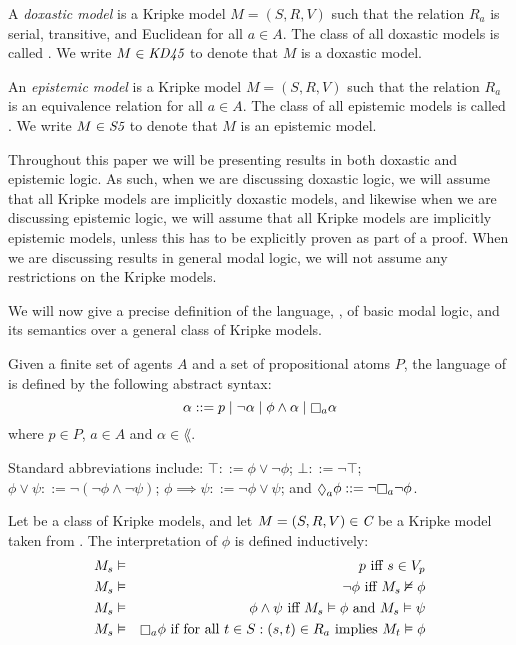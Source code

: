 \begin{definition}
A \textit{doxastic model} is a Kripke model $M = (S, R, V)$ such that the
relation $R_a$ is serial, transitive, and Euclidean for all $a \in A$. The class
of all doxastic models is called \classKD{}. We write $M \in \textit{KD45}{}$ to
denote that $M$ is a doxastic model.
\end{definition}

\begin{definition}
An \textit{epistemic model} is a Kripke model $M = (S, R, V)$ such that the
relation $R_a$ is an equivalence relation for all $a \in A$. The class of all
epistemic models is called \classS{}. We write $M \in \textit{S5}{}$ to denote that
$M$ is an epistemic model.
\end{definition}

Throughout this paper we will be presenting results in both doxastic and
epistemic logic.  As such, when we are discussing doxastic logic, we will
assume that all Kripke models are implicitly doxastic models, and likewise when
we are discussing epistemic logic, we will assume that all Kripke models are
implicitly epistemic models, unless this has to be explicitly proven as part of
a proof. When we are discussing results in general modal logic, we will not
assume any restrictions on the Kripke models.

We will now give a precise definition of the language, \lang{}, of basic modal
logic, and its semantics over a general class of Kripke models.

\begin{definition}
Given a finite set of agents $A$ and a set of propositional atoms $P$, the
language of \langF{} is defined by the following abstract syntax:
$$
\alpha ::=  p \bnfalt
            \neg \alpha \bnfalt
            \phi \land \alpha \bnfalt
            \knows_a \alpha
$$
where $p \in P$, $a \in A$ and $\alpha \in \lang{}$.
\end{definition}

Standard abbreviations include:
$\top ::= \phi \lor \neg \phi$;
$\bot ::= \neg \top$;
$\phi \lor \psi ::= \neg (\neg \phi \land \neg \psi)$;
$\phi \implies \psi ::= \neg \phi \lor \psi$;
and $\suspects_a \phi ::= \neg \knows_a \neg \phi$.

\begin{definition}
Let \classC{} be a class of Kripke models, and let $M = (S, R, V) \in \textit{C}$
be a Kripke model taken from \classC{}. The interpretation of $\phi$ is defined
inductively:
\begin{eqnarray*}
M_s &\entails& p \text{ iff } s \in V_p\\
M_s &\entails& \neg \phi \text{ iff } M_s \nentails \phi\\
M_s &\entails& \phi \land \psi \text{ iff } M_s \entails \phi \text{ and } M_s
\entails \psi\\
M_s &\entails& \knows_a \phi \text{ if for all } t \in S : (s, t) \in R_a \text{
implies } M_t \entails \phi
\end{eqnarray*}
\end{definition}

